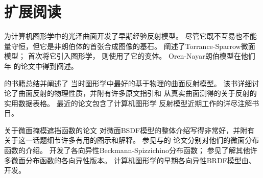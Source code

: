 \section{扩展阅读}\label{sec:扩展阅读08}
\citet{10.1145/360825.360839}为计算机图形学中的光泽曲面开发了早期经验反射模型。
尽管它既不互易也不能量守恒，但它是非朗伯体的首张合成图像的基石。
\citet{Torrance:67}阐述了Torrance-Sparrow微面模型；
\citet{10.1145/965141.563893}首次将它引入图形学，
\citet{10.1145/800224.806819,10.1145/357290.357293}则使用了它的变体。
Oren-Nayar朗伯模型在他们\citeyear{10.1145/192161.192213}年
的论文\citep{10.1145/192161.192213}中得到阐述。

\citet{10.1007/978-1-4612-3526-2}的书籍总结并阐述了
当时图形学中最好的基于物理的曲面反射模型。
该书详细讨论了曲面反射的物理性质，并附有许多原文指引和
从真实曲面测得的关于反射的实用数据表格。
\citet{Burley:2012:PBS}最近的论文包含了计算机图形学
反射模型近期工作的详尽注解书目。

\citet{heitz:hal-01024289}关于微面掩模遮挡函数的论文
对微面BSDF模型的整体介绍写得非常好，并附有关于这一话题细节许多有用的图示和解释。
参见\citet{1987BeckmannSpizzichino}与\citet{Trowbridge:75}的
论文分别对他们的微面分布函数的介绍。
\citet{10.1145/1722991.1722996}开发了各向异性Beckmann-Spizzichino分布函数；
参见\citet{heitz:hal-01024289}了解其他许多微面分布函数的各向异性版本。
计算机图形学的早期各向异性BRDF模型由\citet{10.1145/325334.325167}、
\citet{10.1145/97879.97909}开发。
